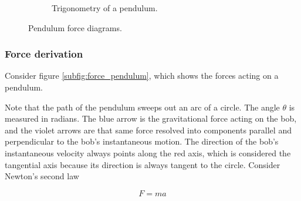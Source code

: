 \begin{figure}[H]
\begin{subfigure}{0.5\textwidth}
    \caption{Trigonometry of a pendulum.}
    \label{subfig:trig_pendulum}
  \end{subfigure}
  \caption{Pendulum force diagrams.}
\end{figure}

\subsubsection{Force derivation}

Consider figure \ref{subfig:force_pendulum}, which shows the forces acting on a
pendulum.

Note that the path of the pendulum sweeps out an arc of a circle. The angle
$\theta$ is measured in radians. The blue arrow is the gravitational force
acting on the bob, and the violet arrows are that same force resolved into
components parallel and perpendicular to the bob's instantaneous motion. The
direction of the bob's instantaneous velocity always points along the red axis,
which is considered the tangential axis because its direction is always tangent
to the circle. Consider Newton's second law

\begin{equation*}
  F = ma
\end{equation*}

